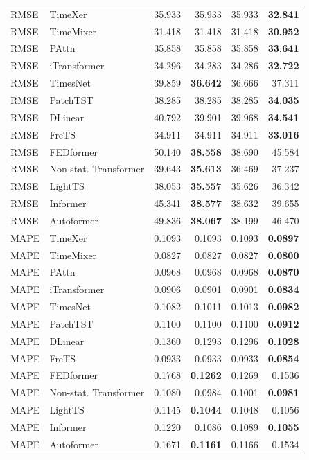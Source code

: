 \begin{longtable}{llrrrr}
\midrule
RMSE & TimeXer & 35.933 & 35.933 & 35.933 & \textbf{32.841} \\
RMSE & TimeMixer & 31.418 & 31.418 & 31.418 & \textbf{30.952} \\
RMSE & PAttn & 35.858 & 35.858 & 35.858 & \textbf{33.641} \\
RMSE & iTransformer & 34.296 & 34.283 & 34.286 & \textbf{32.722} \\
RMSE & TimesNet & 39.859 & \textbf{36.642} & 36.666 & 37.311 \\
RMSE & PatchTST & 38.285 & 38.285 & 38.285 & \textbf{34.035} \\
RMSE & DLinear & 40.792 & 39.901 & 39.968 & \textbf{34.541} \\
RMSE & FreTS & 34.911 & 34.911 & 34.911 & \textbf{33.016} \\
RMSE & FEDformer & 50.140 & \textbf{38.558} & 38.690 & 45.584 \\
RMSE & Non-stat. Transformer & 39.643 & \textbf{35.613} & 36.469 & 37.237 \\
RMSE & LightTS & 38.053 & \textbf{35.557} & 35.626 & 36.342 \\
RMSE & Informer & 45.341 & \textbf{38.577} & 38.632 & 39.655 \\
RMSE & Autoformer & 49.836 & \textbf{38.067} & 38.199 & 46.470 \\
\midrule
MAPE & TimeXer & 0.1093 & 0.1093 & 0.1093 & \textbf{0.0897} \\
MAPE & TimeMixer & 0.0827 & 0.0827 & 0.0827 & \textbf{0.0800} \\
MAPE & PAttn & 0.0968 & 0.0968 & 0.0968 & \textbf{0.0870} \\
MAPE & iTransformer & 0.0906 & 0.0901 & 0.0901 & \textbf{0.0834} \\
MAPE & TimesNet & 0.1082 & 0.1011 & 0.1013 & \textbf{0.0982} \\
MAPE & PatchTST & 0.1100 & 0.1100 & 0.1100 & \textbf{0.0912} \\
MAPE & DLinear & 0.1360 & 0.1293 & 0.1296 & \textbf{0.1028} \\
MAPE & FreTS & 0.0933 & 0.0933 & 0.0933 & \textbf{0.0854} \\
MAPE & FEDformer & 0.1768 & \textbf{0.1262} & 0.1269 & 0.1536 \\
MAPE & Non-stat. Transformer & 0.1080 & 0.0984 & 0.1001 & \textbf{0.0981} \\
MAPE & LightTS & 0.1145 & \textbf{0.1044} & 0.1048 & 0.1056 \\
MAPE & Informer & 0.1220 & 0.1086 & 0.1089 & \textbf{0.1055} \\
MAPE & Autoformer & 0.1671 & \textbf{0.1161} & 0.1166 & 0.1534 \\
\end{longtable}
\endgroup

